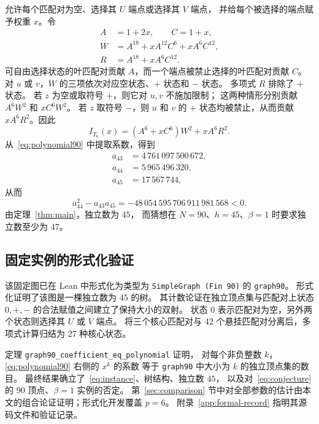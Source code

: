 \documentclass[UTF8,11pt,a4paper,fontset=fandol]{ctexart}
\theoremstyle{remark}
\numberwithin{equation}{section}
\begin{document}
允许每个匹配对为空、选择其 $U$ 端点或选择其 $V$ 端点，
并给每个被选择的端点赋予权重 $x$。令
\begin{equation}\label{eq:local-polynomials}
\begin{aligned}
 A&=1+2x,\qquad C=1+x,\\
 W&=A^{18}+xA^{12}C^6+xA^6C^{12},\\
 R&=A^{18}+xA^6C^{12}.
\end{aligned}
\end{equation}
可自由选择状态的叶匹配对贡献 $A$，而一个端点被禁止选择的叶匹配对贡献 $C$。
对 $u$ 或 $v$，$W$ 的三项依次对应空状态、$+$ 状态和 $-$ 状态。
多项式 $R$ 排除了 $+$ 状态。
若 $z$ 为空或取符号 $+$，则它对 $u,v$ 不施加限制；
这两种情形分别贡献 $A^6W^2$ 和 $xC^6W^2$。
若 $z$ 取符号 $-$，则 $u$ 和 $v$ 的 $+$ 状态均被禁止，从而贡献 $xA^6R^2$。因此
\begin{equation}\label{eq:polynomial90}
 I_{T_6}(x)=(A^6+xC^6)W^2+xA^6R^2.
\end{equation}
从~\eqref{eq:polynomial90} 中提取系数，得到
\begin{equation}
\begin{aligned}
 a_{43}&=4\,761\,097\,500\,672,\\
 a_{44}&=5\,965\,496\,320,\\
 a_{45}&=17\,567\,744,
\end{aligned}
\label{eq:instance}
\end{equation}
从而
\begin{equation}\label{eq:instance-difference}
 a_{44}^{2}-a_{43}a_{45}=-48\,054\,595\,706\,911\,981\,568<0.
\end{equation}
由定理~\ref{thm:main}，独立数为 $45$，
而猜想在 $N=90$、$h=45$、$\beta=1$ 时要求独立数至少为 $47$。

\subsection{固定实例的形式化验证}

该固定图已在 Lean 中形式化为类型为 \texttt{SimpleGraph (Fin 90)} 的 \nolinkurl{graph90}。
形式化证明了该图是一棵独立数为 $45$ 的树。
其计数论证在独立顶点集与匹配对上状态 $0,+,-$ 的合法赋值之间建立了保持大小的双射。
状态 $0$ 表示匹配对为空，另外两个状态则选择其 $U$ 或 $V$ 端点。
将三个核心匹配对与 42 个悬挂匹配对分离后，多项式计算归结为 27 种核心状态。

定理 \nolinkurl{graph90_coefficient_eq_polynomial} 证明，
对每个非负整数 $k$，\eqref{eq:polynomial90} 右侧的 $x^k$ 的系数
等于 \nolinkurl{graph90} 中大小为 $k$ 的独立顶点集的数目。
最终结果确立了~\eqref{eq:instance}、树结构、独立数 $45$，
以及对~\eqref{eq:conjecture} 的 90 顶点、$\beta=1$ 实例的否定。
第~\ref{sec:comparison} 节中对全部参数的估计由本文的组合论证证明；形式化开发覆盖 $p=6$。
附录~\ref{app:formal-record} 指明其源码文件和验证记录。
\end{document}
